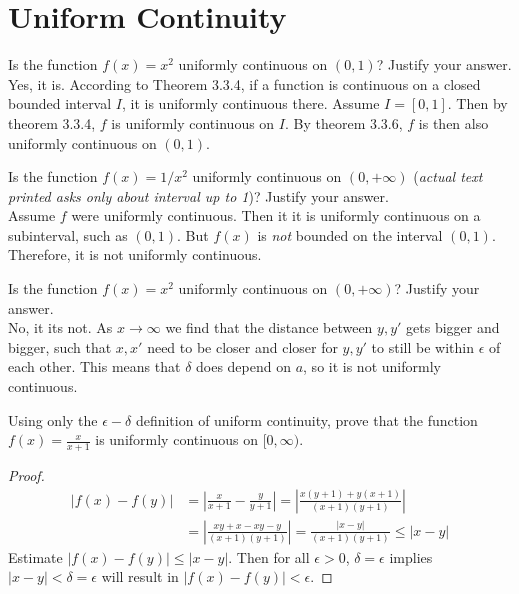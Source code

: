 \documentclass[12pt]{book}
\newenvironment{exercise}[2][Exercise]{\begin{trivlist}
\item[\hskip \labelsep {\bfseries #1}\hskip \labelsep {\bfseries #2.}]}{\end{trivlist}}
\begin{document}
\section{Uniform Continuity}

\begin{exercise}{3.3.1}
Is the function $f(x)=x^2$ uniformly continuous on $(0,1)$? Justify your answer. \\

Yes, it is. According to Theorem 3.3.4, if a function is continuous on a closed bounded interval $I$, it is uniformly continuous there. Assume $I=[0,1]$. Then by theorem 3.3.4, $f$ is uniformly continuous on $I$. By theorem 3.3.6, $f$ is then also uniformly continuous on $(0,1)$.
\end{exercise}


\begin{exercise}{3.3.2}
    Is the function $f(x)=1/x^2$ uniformly continuous on $(0,+\infty)$ (\emph{actual text printed asks only about interval up to 1})? Justify your answer. \\

    Assume $f$ were uniformly continuous. Then it it is uniformly continuous on a subinterval, such as $(0,1)$. But $f(x)$ is \emph{not} bounded on the interval $(0,1)$. Therefore, it is not uniformly continuous.
\end{exercise}


\begin{exercise}{3.3.3}
Is the function $f(x) = x^2$ uniformly continuous on $(0, + \infty)$? Justify your answer.  \\

No, it its not. As $x \to \infty$ we find that the distance between $y,y'$ gets bigger and bigger, such that $x,x'$ need to be closer and closer for $y,y'$ to still be within $\epsilon$ of each other. This means that $\delta$ does depend on $a$, so it is not uniformly continuous.
\end{exercise}


\begin{exercise}{3.3.4}
    Using only the $\epsilon-\delta$ definition of uniform continuity, prove that the function $f(x)=\frac{x}{x+1}$ is uniformly continuous on $[0,\infty)$.

    \begin{proof}
        \begin{align*}
        |f(x)-f(y)| &= | \frac{x}{x+1} - \frac{y}{y+1} | = |\frac{x(y+1) + y(x+1)}{(x+1)(y+1)}| \\
         &= |\frac{xy+x-xy-y}{(x+1)(y+1)}| = \frac{|x-y|}{(x+1)(y+1)} \leq |x-y|
         \end{align*}
    Estimate $|f(x)-f(y)|\leq |x-y|$. Then for all $\epsilon> 0$, $\delta = \epsilon$ implies $|x-y|<\delta = \epsilon$ will result in $|f(x)-f(y)|<\epsilon$.
    \end{proof}
\end{exercise}
\end{document}
